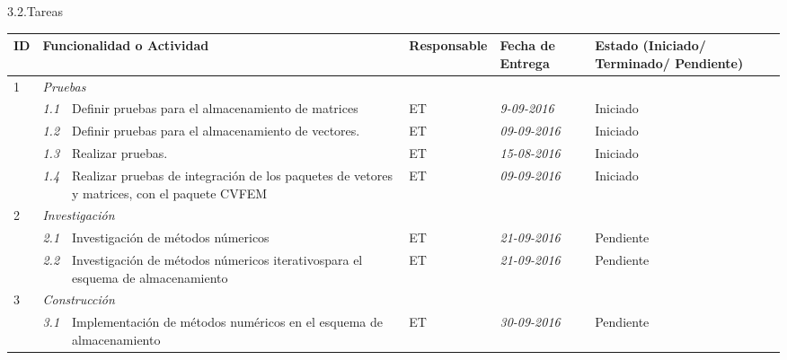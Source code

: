 \documentclass[12pt]{report}
\numberwithin{equation}{section}
\begin{document}
\begin{flushleft}
\large{3.2.Tareas}\\
\begin{table}[H]
\centering
\begin{tabular}{|m{0.5cm}|m{0.7cm}|m{2.5cm}|m{3cm}|m{2.5cm}|m{2.5cm}|}
\hline
\textbf{ID} & \multicolumn{2}{|l|}{\textbf{Funcionalidad o Actividad}} & \textbf{Responsable} & \textbf{Fecha de Entrega} & \textbf{Estado (Iniciado/ Terminado/ Pendiente)}\\
\hline \hline
1 & \multicolumn{5}{|l|}{\textit{Pruebas}}\\
\hline
  & \textit{1.1} & \small{Definir pruebas para el almacenamiento de matrices} & \small{ET} & \small{\textit{9-09-2016}} &  \small{Iniciado}\\ 
\hline
  & \textit{1.2} &\small{Definir pruebas para el almacenamiento de vectores.} & \small{ET}& \small{\textit{09-09-2016}} &  \small{Iniciado}\\
\hline
 & \textit{1.3} &\small{Realizar pruebas.} & \small{ET}& \small{\textit{15-08-2016}} &  \small{Iniciado}\\ 
\hline
 & \textit{1.4} &\small{Realizar pruebas de integraci\'on de los paquetes de vetores y matrices, con el paquete CVFEM} & \small{ET}& \small{\textit{09-09-2016}} &  \small{Iniciado}\\ 
\hline
 2 & \multicolumn{5}{|l|}{\textit{Investigaci\'on}}\\
\hline
 & \textit{2.1} &\small{Investigaci\'on de métodos n\'umericos} & \small{ET}& \small{\textit{21-09-2016}} &  \small{Pendiente}\\ 
  & \textit{2.2} & \small{Investigaci\'on de métodos n\'umericos iterativospara el esquema de almacenamiento} &\small{ET} & \small{\textit{21-09-2016}} &  \small{Pendiente} \\ 
\hline
 3 & \multicolumn{5}{|l|}{\textit{Construcci\'on}}\\
\hline
  & \textit{3.1} & \small{Implementaci\'on de m\'etodos num\'ericos en el esquema de almacenamiento} & \small{ET} & \small{\textit{30-09-2016}} &  \small{Pendiente} \\ 
\hline

\end{tabular}

\end{table}





\end{flushleft}
\end{document}
